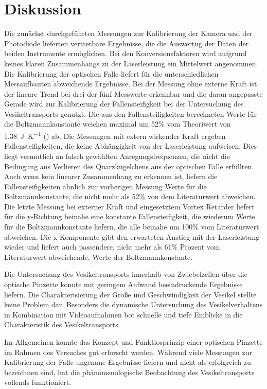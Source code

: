 \newpage
\section{Diskussion}
    Die zunächst durchgeführten Messungen zur Kalibrierung der Kamera und der Photodiode lieferten vertretbare Ergebnisse, die die Auswertug der Daten der beiden Instrumente ermöglichen. Bei den 
    Konversionsfaktoren wird aufgrund keines klaren Zusammenhangs zu der Laserleistung ein Mittelwert angenommen.
    Die Kalibrierung der optischen Falle liefert für die unterschiedlichen Messaufbauten abweichende Ergebnisse. Bei der Messung ohne externe Kraft ist der lineare Trend bei drei der fünf Messwerte
    erkennbar und die daran angepasste Gerade wird zur Kalibrierung der Fallensteifigkeit bei der Untersuchung des Vesikeltransports genutzt. Die aus den Fallensteifigkeiten berechneten Werte für die
    Boltzmannkonstante weichen maximal um 52\% vom Theoriwert von \SI{1.38}{\joule\per\kelvin} (\cite{national_institute_of_standars_and_technology_nist_nodate}) ab. Die Messungen mit extern wirkender Kraft
    ergeben Fallensteifigkeiten, die keine Abhängigkeit von der Laserleistung aufweisen. Dies liegt vermutlich an falsch gewählten Anregungsfrequenzen, die nicht die Bedingung ans Verlieren des Quarzkügelchens
    aus der optischen Falle erfüllten. Auch wenn kein linearer Zusammenhang zu erkennen ist, liefern die Fallensteifigkeiten ähnlich zur vorherigen Messung Werte für die Boltzmannkonstante, die nicht mehr als
    52\% von dem Literaturwert abweichen. Die letzte Messung bei externer Kraft und eingesetztem Vortex Retarder liefert für die y-Richtung beinahe eine konstante Fallensteifigkeit, die wiederum Werte für
    die Boltzmannkonstante liefern, die alle beinahe um 100\% vom Literaturwert abweichen. Die x-Komponente gibt den erwarteten Anstieg mit der Laserleistung wieder und liefert auch passendere, nicht mehr als 
    61\% Prozent vom Literaturwert abweichende, Werte der Boltzmannkonstante.

    Die Untersuchung des Vesikeltransports innerhalb von Zwiebelzellen über die optische Pinzette konnte mit geringem Aufwand beeindruckende Ergebnisse liefern. Die Charakterisierung der Größe und
    Geschwindigkeit der Vesikel stellte keine Problem dar. Besonders die dynamische Untersuchung des Vesikelverhaltens in Kombination mit Videoaufnahmen bot schnelle und tiefe Einblicke in die
    Charakteristik des Vesikeltransports.

    Im Allgemeinen konnte das Konzept und Funktiosprinzip einer optischen Pinzette im Rahmen des Versuches gut erforscht werden. Während viele Messungen zur Kalibrierung der Falle ungenaue Ergebnisse liefern
    und nicht als erfolgreich zu bezeichnen sind, hat die phänomenologische Beobachtung des Vesikeltransports vollends funktioniert. 
